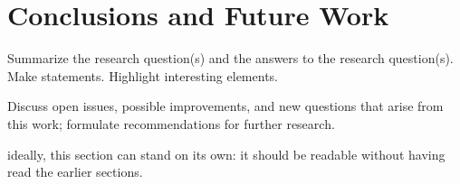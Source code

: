 \section{Conclusions and Future Work}
Summarize the research question(s) and the answers to the research question(s).
Make statements.
Highlight interesting elements.

Discuss open issues, possible improvements, and new questions that arise from this work; formulate recommendations for further research.

ideally, this section can stand on its own: it should be readable without having read the earlier sections.